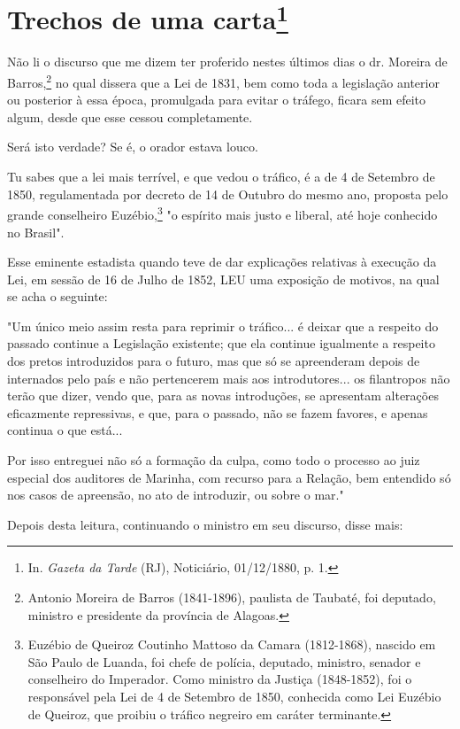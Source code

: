 \chapter{Trechos de uma carta\footnote[*]{In. \emph{Gazeta da Tarde}
  (RJ), Noticiário, 01/12/1880, p. 1.}}


Não li o discurso que me dizem ter proferido nestes últimos dias o dr.
Moreira de Barros,\footnote{Antonio Moreira de Barros (1841-1896),
  paulista de Taubaté, foi deputado, ministro e presidente da província
  de Alagoas.} no qual dissera que a Lei de 1831, bem como toda a
legislação anterior ou posterior à essa época, promulgada para evitar o
tráfego, ficara sem efeito algum, desde que esse cessou completamente.

Será isto verdade? Se é, o orador estava louco.

Tu sabes que a lei mais terrível, e que vedou o tráfico, é a de 4 de
Setembro de 1850, regulamentada por decreto de 14 de Outubro do mesmo
ano, proposta pelo grande conselheiro Euzébio,\footnote{Euzébio de
  Queiroz Coutinho Mattoso da Camara (1812-1868), nascido em São Paulo
  de Luanda, foi chefe de polícia, deputado, ministro, senador e
  conselheiro do Imperador. Como ministro da Justiça (1848-1852), foi o
  responsável pela Lei de 4 de Setembro de 1850, conhecida como Lei
  Euzébio de Queiroz, que proibiu o tráfico negreiro em caráter
  terminante.} "o espírito
mais justo e liberal, até hoje conhecido no Brasil".

Esse eminente estadista quando teve de dar explicações relativas à
execução da Lei, em sessão de 16 de Julho de 1852, LEU uma exposição de
motivos, na qual se acha o seguinte:

"Um único meio assim resta para reprimir o tráfico... é deixar que a
respeito do passado continue a Legislação existente; que ela continue
igualmente a respeito dos pretos introduzidos para o futuro, mas que só
se apreenderam depois de internados pelo país e não pertencerem mais aos
introdutores... os filantropos não terão que dizer, vendo que, para as
novas introduções, se apresentam alterações eficazmente repressivas, e
que, para o passado, não se fazem favores, e apenas continua o que
está...

Por isso entreguei não só a formação da culpa, como todo o processo ao
juiz especial dos auditores de Marinha, com recurso para a Relação, bem
entendido só nos casos de apreensão, no ato de introduzir, ou sobre o
mar."

Depois desta leitura, continuando o ministro em seu discurso, disse
mais:

